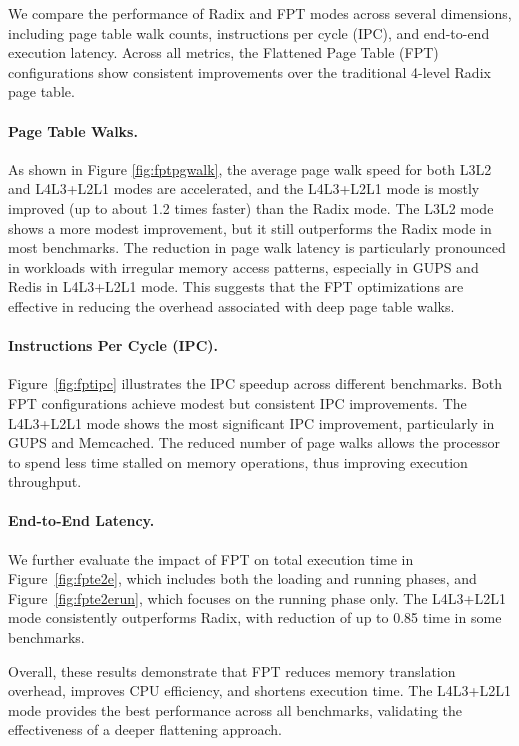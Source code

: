 We compare the performance of Radix and FPT modes across several dimensions, including page table walk counts, instructions per cycle (IPC), and end-to-end execution latency. Across all metrics, the Flattened Page Table (FPT) configurations show consistent improvements over the traditional 4-level Radix page table.

\paragraph{Page Table Walks.}

As shown in Figure \ref{fig:fptpgwalk}, the average page walk speed for both L3L2 and L4L3+L2L1 modes are accelerated, and the L4L3+L2L1 mode is mostly improved (up to about 1.2 times faster) than the Radix mode. The L3L2 mode shows a more modest improvement, but it still outperforms the Radix mode in most benchmarks. The reduction in page walk latency is particularly pronounced in workloads with irregular memory access patterns, especially in GUPS and Redis in L4L3+L2L1 mode. This suggests that the FPT optimizations are effective in reducing the overhead associated with deep page table walks.

\paragraph{Instructions Per Cycle (IPC).}
Figure~\ref{fig:fptipc} illustrates the IPC speedup across different benchmarks. Both FPT configurations achieve modest but consistent IPC improvements. The L4L3+L2L1 mode shows the most significant IPC improvement, particularly in GUPS and Memcached. The reduced number of page walks allows the processor to spend less time stalled on memory operations, thus improving execution throughput.

\paragraph{End-to-End Latency.}
We further evaluate the impact of FPT on total execution time in Figure~\ref{fig:fpte2e}, which includes both the loading and running phases, and Figure~\ref{fig:fpte2erun}, which focuses on the running phase only. The L4L3+L2L1 mode consistently outperforms Radix, with reduction of up to 0.85 time in some benchmarks.

Overall, these results demonstrate that FPT reduces memory translation overhead, improves CPU efficiency, and shortens execution time. The L4L3+L2L1 mode provides the best performance across all benchmarks, validating the effectiveness of a deeper flattening approach.

